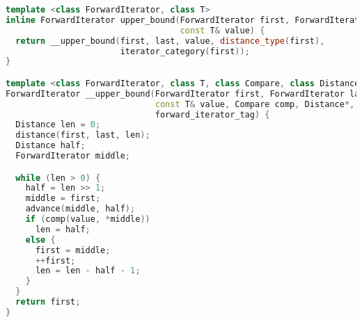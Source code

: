 \begin{lstlisting}[language=C++]
template <class ForwardIterator, class T>
inline ForwardIterator upper_bound(ForwardIterator first, ForwardIterator last,
                                   const T& value) {
  return __upper_bound(first, last, value, distance_type(first),
                       iterator_category(first));
}

template <class ForwardIterator, class T, class Compare, class Distance>
ForwardIterator __upper_bound(ForwardIterator first, ForwardIterator last,
                              const T& value, Compare comp, Distance*,
                              forward_iterator_tag) {
  Distance len = 0;
  distance(first, last, len);
  Distance half;
  ForwardIterator middle;

  while (len > 0) {
    half = len >> 1;
    middle = first;
    advance(middle, half);
    if (comp(value, *middle))
      len = half;
    else {
      first = middle;
      ++first;
      len = len - half - 1;
    }
  }
  return first;
}

\end{lstlisting}